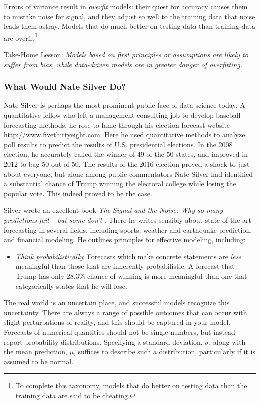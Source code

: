 \documentclass[10pt]{article}
\begin{document}
Errors of variance result in \textit{overfit} models: their quest for accuracy causes them to mistake noise for signal, and they adjust so well to the training data that noise leads them astray. Models that do much better on testing data than training data are overfit\footnote{To complete this taxonomy, models that do better on testing data than the training data are said to be cheating.}

Take-Home Lesson: \textit{Models based on first principles or assumptions are likely to suffer from bias, while data-driven models are in greater danger of overfitting.}

\subsubsection{What Would Nate Silver Do?}

Nate Silver is perhaps the most prominent public face of data science today. A quantitative fellow who left a management consulting job to develop baseball forecasting methods, he rose to fame through his election forecast website \url{http://www.fivethirtyeight.com}. Here he used quantitative methods to analyze poll results to predict the results of U.S. presidential elections. In the 2008 election, he accurately called the winner of 49 of the 50 states, and improved in 2012 to bag 50 out of 50. The results of the 2016 election proved a shock to just about everyone, but alone among public commentators Nate Silver had identified a substantial chance of Trump winning the electoral college while losing the popular vote. This indeed proved to be the case.

Silver wrote an excellent book \textit{The Signal and the Noise: Why so many predictions fail – but some don’t} \cite{Sil12}. There he writes sensibly about state-of-the-art forecasting in several fields, including sports, weather and earthquake prediction, and financial modeling. He outlines principles for effective modeling, including:

\begin{itemize}
  \item \textit{Think probabilistically}: Forecasts which make concrete statements are \textit{less} meaningful than those that are inherently probabilistic. A forecast that Trump has only 28.3\% chance of winning is more meaningful than one that categorically states that he will lose.
\end{itemize}

The real world is an uncertain place, and successful models recognize this uncertainty. There are always a range of possible outcomes that can occur with slight perturbations of reality, and this should be captured in your model. Forecasts of numerical quantities should not be single numbers, but instead report probability distributions. Specifying a standard deviation, \(\sigma\), along with the mean prediction, \(\mu\), suffices to describe such a distribution, particularly if it is assumed to be normal.
\end{document}
